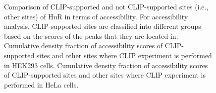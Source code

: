 \begin{figure}[H]
	\centering
\quad
\caption[Accessibility of HuR protein]{Comparison of CLIP-supported and not CLIP-supported sites (i.e., other sites) of HuR in terms of accessibility. For accessibility analysis, CLIP-supported sites are classified into different groups based on the scores of the peaks that they are located in.  Cumulative density fraction of accessibility scores of CLIP-supported sites and other sites where CLIP experiment is performed in HEK293 cells.  Cumulative density fraction of accessibility scores of CLIP-supported sites and other sites where CLIP experiment is performed in HeLa cells.}
\label{HuR_accessibility}
\end{figure}

